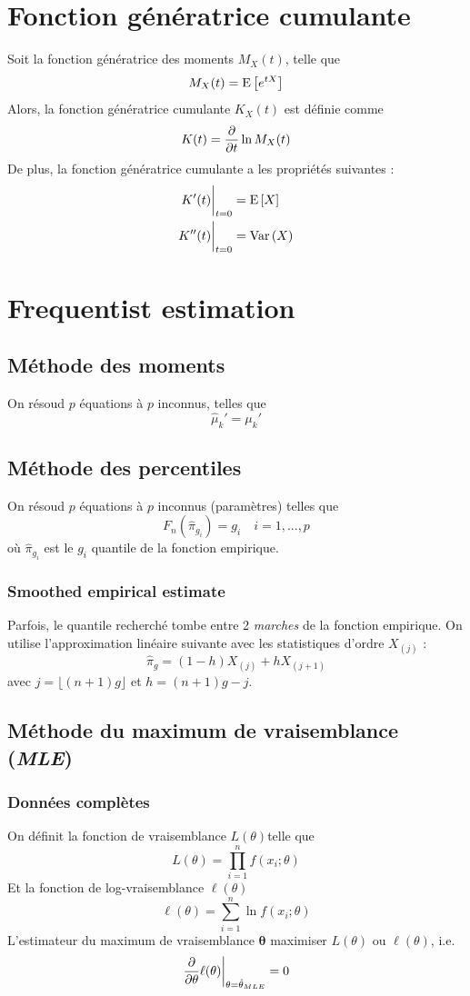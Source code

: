 \documentclass[french, landscape]{article}
\begin{document}
\begin{multicols*}{3}
\section{Fonction génératrice cumulante}
Soit la fonction génératrice des moments $M_X(t)$, telle que
\[M_X(t) = \mathrm{E} \left[ e^{tX} \right]\]
Alors, la fonction génératrice cumulante $K_X(t)$ est définie comme
\[K(t) = \frac{\partial}{\partial t} \ln M_X(t)\]
De plus, la fonction génératrice cumulante a les propriétés suivantes : 
\begin{align*}
K'(t) \biggr \rvert_{t = 0} & =   \mathrm{E} \left[ X \right] \\
K''(t) \biggr \rvert_{t=0} & = \mathrm{Var} \left( X \right) \\
\end{align*}


\section{Frequentist estimation}
\subsection*{Méthode des moments}
On résoud $p$ équations à $p$ inconnus, telles que
\[\hat{\mu}_k' = \mu_k'\]

\subsection*{Méthode des percentiles}
On résoud $p$ équations à $p$ inconnus (paramètres) telles que
\[F_n(\hat{\pi}_{g_i}) = g_i \quad  i = 1, ..., p\]
où $\hat{\pi}_{g_i}$ est le $g_i$ quantile de la fonction empirique.

\subsubsection*{Smoothed empirical estimate}
Parfois, le quantile recherché tombe entre 2 \emph{marches} de la fonction empirique. On utilise l'approximation linéaire suivante avec les statistiques d'ordre $X_{(j)}$ : 
\[\hat{\pi}_{g}  = (1-h)X_{(j)} + h X_{(j+1)} \]
avec $j = \lfloor (n+1)g \rfloor$ et $h = (n+1) g - j$.

\subsection*{Méthode du maximum de vraisemblance (\emph{MLE})}
\subsubsection*{Données complètes}
On définit la fonction de vraisemblance  $L(\theta)$telle que
\[L(\theta) = \prod_{i=1}^{n} f(x_i ; \theta)\]
Et la fonction de log-vraisemblance $\ell(\theta)$
\[\ell(\theta) = \sum_{i=1}^{n}  \ln f(x_i ; \theta) \]
L'estimateur du maximum de vraisemblance $\bm{\theta}$ maximiser $L(\theta)$ ou $\ell(\theta)$, i.e.
\[\frac{\partial}{\partial \theta} \ell(\theta) \biggr \rvert_{\theta = \hat{\theta}_{MLE}}  = 0\]


\end{multicols*}
\end{document}
